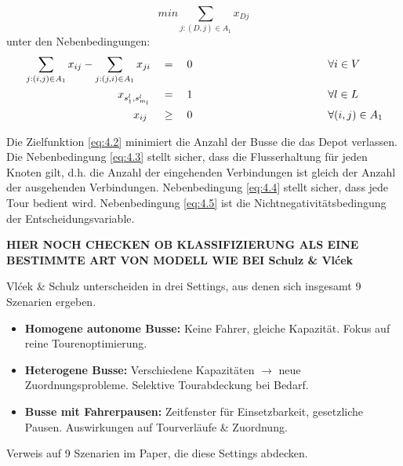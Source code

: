 \begin{equation}
    min \sum_{j:(D,j) \in A_1} x_{Dj}
\label{eq:4.2}
\end{equation}
unter den Nebenbedingungen:
\begin{alignat}{3}
    &\sum_{j:(i,j) \in A_1} x_{ij} - \sum_{j:(j,i) \in A_1} x_{ji} &&= \quad 0 \hspace{4cm} &&\forall i \in V \label{eq:4.3}\\
    &\hspace{3cm} x_{s_1^l, s_{m_l}^l} &&= \quad 1\hspace{4cm} &&\forall l \in L\label{eq:4.4}\\
    &\hspace{3.5cm} x_{ij} &&\geq \quad 0 \hspace{4cm}&&\forall (i,j) \in A_1\label{eq:4.5}
\end{alignat}

Die Zielfunktion \ref{eq:4.2} minimiert die Anzahl der Busse die das Depot verlassen. Die Nebenbedingung \ref{eq:4.3} stellt sicher, dass die Flusserhaltung für jeden Knoten gilt, d.h. die Anzahl der eingehenden Verbindungen ist gleich der Anzahl der ausgehenden Verbindungen. Nebenbedingung \ref{eq:4.4} stellt sicher, dass jede Tour bedient wird. Nebenbedingung \ref{eq:4.5} ist die Nichtnegativitätsbedingung der Entscheidungsvariable.

\textbf{HIER NOCH CHECKEN OB KLASSIFIZIERUNG ALS EINE BESTIMMTE ART VON MODELL WIE BEI Schulz \& Vlćek}


Vlćek \& Schulz unterscheiden in drei Settings, aus denen sich insgesamt 9 Szenarien ergeben. 
\begin{itemize}
    \item \textbf{Homogene autonome Busse:} Keine Fahrer, gleiche Kapazität. Fokus auf reine Tourenoptimierung.
    \item \textbf{Heterogene Busse:} Verschiedene Kapazitäten \(\rightarrow\) neue Zuordnungsprobleme. Selektive Tourabdeckung bei Bedarf.
    \item \textbf{Busse mit Fahrerpausen:} Zeitfenster für Einsetzbarkeit, gesetzliche Pausen. Auswirkungen auf Tourverläufe \& Zuordnung.
\end{itemize}

Verweis auf  9 Szenarien im Paper, die diese Settings abdecken.

